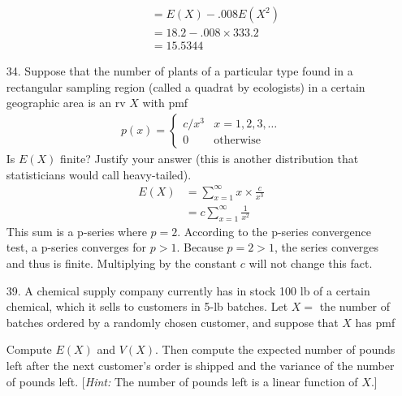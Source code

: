 \documentclass[letterpaper,12pt]{article}
\begin{document}
\begin{enumerate}
\begin{enumerate}
\begin{align*}
          &= E(X) - .008E(X^2) \\
          &= 18.2 - .008 \times 333.2 \\
          &= 15.5344
        \end{align*}
    \end{enumerate}
  \item[34.]
    Suppose that the number of plants of a particular type found in a rectangular sampling region (called a quadrat by ecologists) in a certain geographic area is an rv $X$ with pmf
    \begin{align*}
      p(x) = \begin{cases}
        c/x^3 & x = 1, 2, 3, \ldots \\
        0     & \text{otherwise}
      \end{cases}
    \end{align*}
    Is $E(X)$ finite? Justify your answer (this is another distribution that statisticians would call heavy-tailed).
    \begin{align*}
      E(X) &= \sum_{x = 1}^\infty x \times \frac{c}{x^3} \\
      &= c \sum_{x = 1}^\infty \frac{1}{x^2}
    \end{align*}
    This sum is a p-series where $p = 2$. According to the p-series convergence test, a p-series converges for $p > 1$. Because $p = 2 > 1$, the series converges and thus is finite. Multiplying by the constant $c$ will not change this fact.
  \item[39.]
    A chemical supply company currently has in stock 100 lb of a certain chemical, which it sells to customers in 5-lb batches. Let $X =$ the number of batches ordered by a randomly chosen customer, and suppose that $X$ has pmf
    \begin{center}
    \end{center}
    Compute $E(X)$ and $V(X)$. Then compute the expected number of pounds left after the next customer’s order is shipped and the variance of the number of pounds left. [\textit{Hint:} The number of pounds left is a linear function of $X$.]
\end{enumerate}
\end{document}
